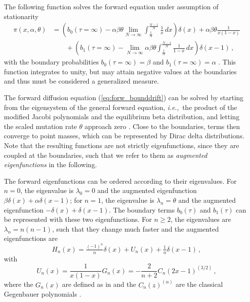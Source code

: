 \documentclass[preprint]{elsarticle}
\newcommand\ie{{\it i.e.,}}
\begin{document}
The following function solves the forward equation under assumption of stationarity
\begin{equation}
\begin{split}
    \pi(x, \alpha, \theta)&=\left(b_0(\tau=\infty)-\alpha\beta\theta \lim_{N\to\infty}\int_{\tfrac1N}^{\tfrac{N-1}N} \frac1x\,dx\right)\delta(x)+\alpha\beta\theta\frac{1}{x(1-x)} \\
    &\qquad+\left(b_1(\tau=\infty)-\lim_{N\to\infty}\alpha\beta\theta \int_{\tfrac1N}^{\tfrac{N-1}N} \frac1{1-x}\,dx\right)\delta(x-1)\,,
\end{split}
\end{equation}
with the boundary probabilities $b_0(\tau=\infty)=\beta$ and $b_1(\tau=\infty)=\alpha$ \citep{Vogl15,Vogl16}. This function integrates to unity, but may attain negative values at the boundaries and thus must be considered a generalized measure. 

The forward diffusion equation (\ref{eq:forw_bounddrift}) can be solved by starting from the eigensystem of the general forward equation, \ie\ the product of the modified Jacobi polynomials \citep{Song12} and the equilibrium beta distribution, and letting the scaled mutation rate $\theta$ approach zero \citep[][Appendix A.1]{Vogl15}. Close to the boundaries, terms then converge to point masses, which can be represented by Dirac delta distributions. Note that the resulting functions are not strictly eigenfunctions, since they are coupled at the boundaries, such that we refer to them as \textit{augmented eigenfunctions} in the following. 

The forward eigenfunctions can be ordered according to their eigenvalues. For $n=0$, the eigenvalue is $\lambda_0=0$ and the augmented eigenfunction $\beta\delta(x)+\alpha\delta(x-1)$; for $n=1$, the eigenvalue is $\lambda_n=\theta$ and the augmented eigenfunction $-\delta(x)+\delta(x-1)$. The boundary terms $b_0(\tau)$ and $b_1(\tau)$ can be represented with these two eigenfunctions. For $n\geq 2$, the eigenvalues are $\lambda_n=n(n-1)$, such that they change much faster and the augmented eigenfunctions are \begin{equation}\label{eq:forw_eigen}
    H_n(x)=\tfrac{(-1)^n}{n}\delta(x)+U_n(x)+\tfrac{1}{n}\delta(x-1)\,,
\end{equation}
with 
\begin{equation}
    U_n(x)=\frac1{x(1-x)}G_n(x)=-\frac2{n+2}C_n(2x-1)^{(3/2)}\,,
\end{equation}
where the $G_n(x)$ are defined as in \citet{Song12} and the $C_n(z)^{(\alpha)}$ are the classical Gegenbauer polynomials \citep{Abra70}.
\end{document}
